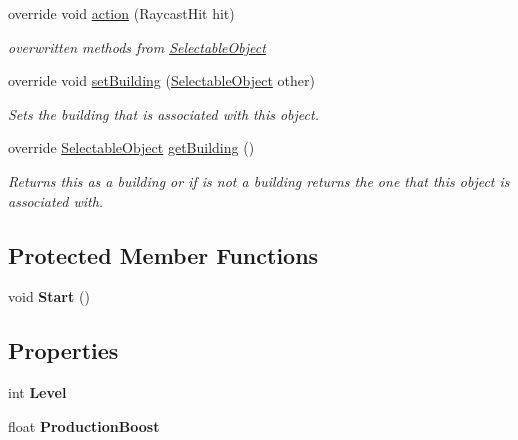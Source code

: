 \begin{DoxyCompactItemize}
override void \mbox{\hyperlink{class_cell_aecb362e44d7117cb4ecb1961092bcb28}{action}} (Raycast\+Hit hit)
\begin{DoxyCompactList}\small\item\em overwritten methods from \mbox{\hyperlink{class_selectable_object}{Selectable\+Object}} \end{DoxyCompactList}\item 
override void \mbox{\hyperlink{class_cell_a415c2fd77ec3b53bed8115fddd311a6f}{set\+Building}} (\mbox{\hyperlink{class_selectable_object}{Selectable\+Object}} other)
\begin{DoxyCompactList}\small\item\em Sets the building that is associated with this object. \end{DoxyCompactList}\item 
override \mbox{\hyperlink{class_selectable_object}{Selectable\+Object}} \mbox{\hyperlink{class_cell_ab32941221f7e2df38227961c8d8dbfec}{get\+Building}} ()
\begin{DoxyCompactList}\small\item\em Returns this as a building or if is not a building returns the one that this object is associated with. \end{DoxyCompactList}\end{DoxyCompactItemize}
\subsection*{Protected Member Functions}
\begin{DoxyCompactItemize}
\item 
\mbox{\label{class_cell_a77cdae6b479d62eeb10eeeb73a2170b7}} 
void {\bfseries Start} ()
\end{DoxyCompactItemize}
\subsection*{Properties}
\begin{DoxyCompactItemize}
\item 
\mbox{\label{class_cell_a75f654abcd35344190093ef358203ebe}} 
int {\bfseries Level}
\item 
\mbox{\label{class_cell_a4818b5da03c8ba20807ffddcc3693fa4}} 
float {\bfseries Production\+Boost}
\end{DoxyCompactItemize}
